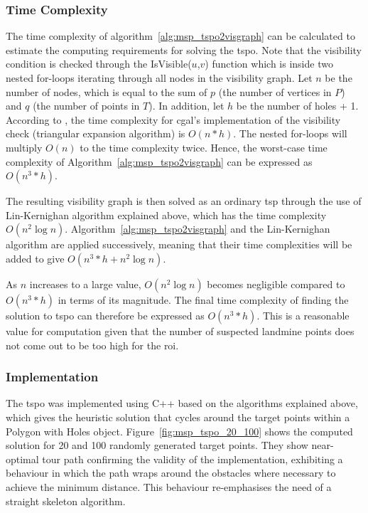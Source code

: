 \subsubsection{Time Complexity}

The time complexity of algorithm~\ref{alg:msp_tspo2visgraph} can be calculated to estimate the computing requirements for solving the \gls{tspo}. Note that the visibility condition is checked through the IsVisible($u$,$v$) function which is inside two nested for-loops iterating through all nodes in the visibility graph. Let $n$ be the number of nodes, which is equal to the sum of $p$ (the number of vertices in $P$) and $q$ (the number of points in $T$). In addition, let $h$ be the number of holes + 1. According to \cite{cgal2024visibility}, the time complexity for \gls{cgal}'s implementation of the visibility check (triangular expansion algorithm) is $O(n*h)$. The nested for-loops will multiply $O(n)$ to the time complexity twice. Hence, the worst-case time complexity of Algorithm~\ref{alg:msp_tspo2visgraph} can be expressed as $O(n^3*h)$. 

The resulting visibility graph is then solved as an ordinary \gls{tsp} through the use of Lin-Kernighan algorithm explained above, which has the time complexity $O(n^2\log{n})$. Algorithm~\ref{alg:msp_tspo2visgraph} and the Lin-Kernighan algorithm are applied successively, meaning that their time complexities will be added to give $O(n^3*h + n^2\log{n})$. 

As $n$ increases to a large value, $O(n^2\log{n})$ becomes negligible compared to $O(n^3*h)$ in terms of its magnitude. The final time complexity of finding the solution to \gls{tspo} can therefore be expressed as $O(n^3*h)$. This is a reasonable value for computation given that the number of suspected landmine points does not come out to be too high for the \gls{roi}. 

\subsubsection{Implementation}

The \gls{tspo} was implemented using C++ based on the algorithms explained above, which gives the heuristic solution that cycles around the target points within a Polygon with Holes object. Figure~\ref{fig:msp_tspo_20_100} shows the computed solution for 20 and 100 randomly generated target points. They show near-optimal tour path confirming the validity of the implementation, exhibiting a behaviour in which the path wraps around the obstacles where necessary to achieve the minimum distance. This behaviour re-emphasises the need of a straight skeleton algorithm. 

